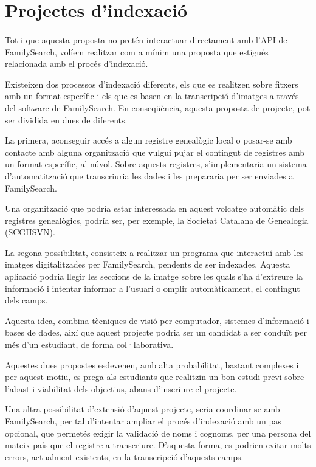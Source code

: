 \section{Projectes d'indexació}

    \paragraph{}
    Tot i que aquesta proposta no pretén interactuar directament amb l'API de Family\-Search, volíem realitzar com a mínim una proposta que estigués relacionada amb el procés d'indexació.

    Existeixen dos processos d'indexació diferents, els que es realitzen sobre fitxers amb un format específic i els que es basen en la transcripció d'imatges a través del software de FamilySearch. En conseqüència, aquesta proposta de projecte, pot ser dividida en dues de diferents.

    La primera, aconseguir accés a algun registre genealògic local o posar-se amb contacte amb alguna organització que vulgui pujar el contingut de registres amb un format específic, al núvol. Sobre aquests registres, s'implementaria un sistema d'automatització que transcriuria les dades i les prepararia per ser enviades a Family\-Search.

    Una organització que podría estar interessada en aquest volcatge automàtic dels registres genealògics, podría ser, per exemple, la Societat Catalana de Genealogia (SCGHSVN).

    La segona possibilitat, consisteix a realitzar un programa que interactuí amb les imatges digitalitzades per FamilySearch, pendents de ser indexades. Aquesta aplicació podria llegir les seccions de la imatge sobre les quals s'ha d'extreure la informació i intentar informar a l'usuari o omplir automàticament, el contingut dels camps.

    Aquesta idea, combina tècniques de visió per computador, sistemes d'informació i bases de dades, així que aquest projecte podria ser un candidat a ser conduït per més d'un estudiant, de forma col·laborativa.

    Aquestes dues propostes esdevenen, amb alta probabilitat, bastant complexes i per aquest motiu, es prega als estudiants que realitzin un bon estudi previ sobre l'abast i viabilitat dels objectius, abans d'inscriure el projecte.

    Una altra possibilitat d'extensió d'aquest projecte, seria coordinar-se amb Family\-Search, per tal d'intentar ampliar el procés d'indexació amb un pas opcional, que permetés exigir la validació de noms i cognoms, per una persona del mateix país que el registre a transcriure. D'aquesta forma, es podrien evitar molts errors, actualment existents, en la transcripció d'aquests camps.
